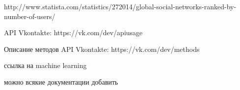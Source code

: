 \documentclass[a4paper]{report}
\begin{document}
\begin{thebibliography}{9}
		http://www.statista.com/statistics/272014/global-social-networks-ranked-by-number-of-users/
		
		API Vkontakte: https://vk.com/dev/apiusage
		
		Описание методов API Vkontakte: https://vk.com/dev/methods
		
		
	
	
		
		ссылка на machine learning
		
		можно всякие документации добавить

	
		
		

		
		
		
		
		
		
		
		
		
		

\end{thebibliography}
\end{document}
